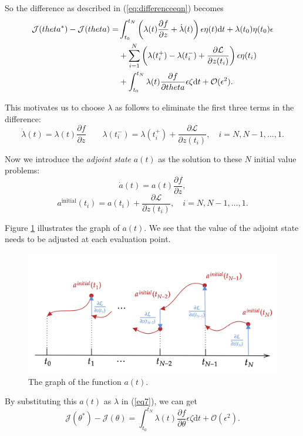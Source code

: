 \documentclass[a4paper,11pt,titlepage]{article}
\theoremstyle{definition}
\theoremstyle{plain}
\theoremstyle{remark}
\begin{document}
So the difference as described in (\ref{eq:differenceeqn}) becomes
\begin{align}
\mathcal{J}(\theta^*)-\mathcal{J}(\theta)=&\int^{t_N}_{t_0}\left(\lambda(t)\frac{\partial f}{\partial z}+\dot{\lambda}(t)\right)\epsilon\eta(t)\mathrm{d}t+\lambda(t_0)\eta(t_0)\epsilon\notag\\
&+\sum^{N}_{i=1} \left(\lambda(t_i^+)-\lambda(t_i^-)+\frac{\partial \mathcal{L}}{\partial z(t_i)}\right)\epsilon\eta(t_i)\notag\\
&+\int^{t_N}_{t_0}\lambda(t)\frac{\partial f}{\partial \theta}\epsilon\zeta\mathrm{d}t+\mathcal{O}(\epsilon^2).
\label{eq6}
\end{align}

This motivates us to choose $\lambda$ as follows to eliminate the first three terms in the difference:
$$
\dot{\lambda}(t)=\lambda(t)\frac{\partial f}{\partial z}\quad\quad \lambda(t_i^-)=\lambda(t_i^+)+\frac{\partial\mathcal{L}}{\partial z(t_i)}, \quad i=N,N-1,\dots,1.
$$

Now we introduce the \textit{adjoint state} $a(t)$ as the solution to these $N$ initial value problems:
\begin{equation}
\dot{a}(t)=a(t)\frac{\partial f}{\partial z},
\label{eq7}
\end{equation}
$$ a^{\mathrm{initial}}
(t_i)=a(t_i)+\frac{\partial\mathcal{L}}{\partial z(t_i)}, \quad i=N,N-1,\dots,1.$$

Figure \ref{fig:graphat} illustrates the graph of $a(t)$. We see that the value of the adjoint state needs to be adjusted at each evaluation point.

\begin{figure}[htbp]
\label{fig9}
    \centering
    \includegraphics[width=0.75\linewidth]{report/figures/BackpropODE.png}
    \caption{The graph of the function $a(t)$.}
    \label{fig:graphat}
\end{figure}

By substituting this $a(t)$ as $\lambda$ in (\ref{eq7}), we can get
$$
\mathcal{J}(\theta^*)-\mathcal{J}(\theta)=\int^{t_N}_{t_0}\lambda(t)\frac{\partial f}{\partial \theta}\epsilon\zeta\mathrm{d}t+\mathcal{O}(\epsilon^2).
$$
\end{document}
